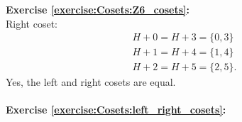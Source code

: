 \noindent\textbf{Exercise \ref{exercise:Cosets:Z6_cosets}:}
\\
Right coset:
\begin{gather*}
H + 0 = H + 3 = \{0, 3\}
\\
H + 1 = H + 4 = \{ 1, 4 \} 
\\
H + 2 = H + 5 = \{ 2, 5 \}.
\end{gather*}
Yes, the left and right cosets are equal.
\\
\\
\textbf{Exercise \ref{exercise:Cosets:left_right_cosets}:}
%
